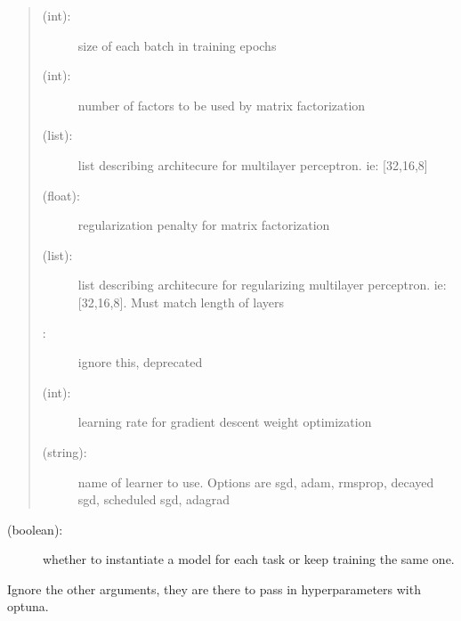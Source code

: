 \documentclass[letterpaper,10pt,english,openany,oneside]{sphinxmanual}
\begin{document}
\begin{fulllineitems}
\begin{description}
\begin{description}
\begin{quote}
\begin{description}
\item[{ (int):}] \leavevmode
size of each batch in training epochs

\item[{ (int):}] \leavevmode
number of factors to be used by matrix factorization

\item[{ (list):}] \leavevmode
list describing architecure for multilayer perceptron. ie: {[}32,16,8{]}

\item[{ (float):}] \leavevmode
regularization penalty for matrix factorization

\item[{ (list):}] \leavevmode
list describing architecure for regularizing multilayer perceptron. ie: {[}32,16,8{]}. Must match length of layers

\item[{ :}] \leavevmode
ignore this, deprecated

\item[{ (int):}] \leavevmode
learning rate for gradient descent weight optimization

\item[{ (string):}] \leavevmode
name of learner to use. Options are sgd, adam, rmsprop, decayed sgd, scheduled sgd, adagrad

\end{description}
\end{quote}
\begin{description}
\item[{ (boolean):}] \leavevmode
whether to instantiate a model for each task or keep training the same one.

\end{description}

\end{description}

Ignore the other arguments, they are there to pass in hyperparameters with optuna.

\end{description}

\end{fulllineitems}
\end{document}

